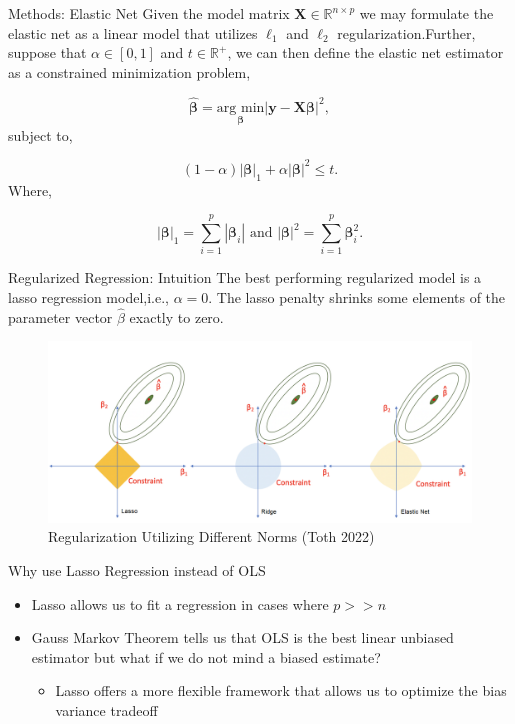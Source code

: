 \documentclass[
  11pt,
  ignorenonframetext,
]{beamer}
\providecommand{\tightlist}{%
  \setlength{\itemsep}{0pt}\setlength{\parskip}{0pt}}
\begin{document}
\begin{frame}{Methods: Elastic Net}
\protect\hypertarget{methods-elastic-net}{}
Given the model matrix \(\mathbf{X} \in \mathbb{R}^{n\times p}\) we may
formulate the elastic net as a linear model that utilizes \(\ell_1\) and
\(\ell_2\) regularization.Further, suppose that \(\alpha \in [0, 1]\)
and \(t \in \mathbb{R}^+\), we can then define the elastic net estimator
as a constrained minimization problem,

\[ 
\boldsymbol{\hat{\beta}} = \underset{\boldsymbol{\beta}}{\text{arg min}} |\mathbf{y} - \mathbf{X}\boldsymbol{\beta}|^2,
\] subject to,

\[
(1 - \alpha)|\boldsymbol{\beta}|_1 + \alpha|\boldsymbol{\beta}|^2 \leq t.
\] Where,

\[
|\boldsymbol{\beta}|_1 = \sum\limits_{i = 1}^{p}|\boldsymbol{\beta}_i|\text{ and } |\boldsymbol{\beta}|^2 = \sum\limits_{i = 1}^{p}\boldsymbol{\beta}_i^2.
\]
\end{frame}

\begin{frame}{Regularized Regression: Intuition}
\protect\hypertarget{regularized-regression-intuition}{}
The best performing regularized model is a lasso regression model,i.e.,
\(\alpha = 0\). The lasso penalty shrinks some elements of the parameter
vector \(\hat\beta\) exactly to zero.

\begin{figure}

{\centering \includegraphics[width=0.9\linewidth]{./../figures/lasso_ridge} 

}

\caption{Regularization Utilizing Different Norms (Toth 2022)}\label{fig:unnamed-chunk-3}
\end{figure}
\end{frame}

\begin{frame}{Why use Lasso Regression instead of OLS}
\protect\hypertarget{why-use-lasso-regression-instead-of-ols}{}
\begin{itemize}
\item
  Lasso allows us to fit a regression in cases where \(p>>n\)
\item
  Gauss Markov Theorem tells us that OLS is the best linear unbiased
  estimator but what if we do not mind a biased estimate?

  \begin{itemize}
  \tightlist
  \item
    Lasso offers a more flexible framework that allows us to optimize
    the bias variance tradeoff
  \end{itemize}
\end{itemize}
\end{frame}
\end{document}
